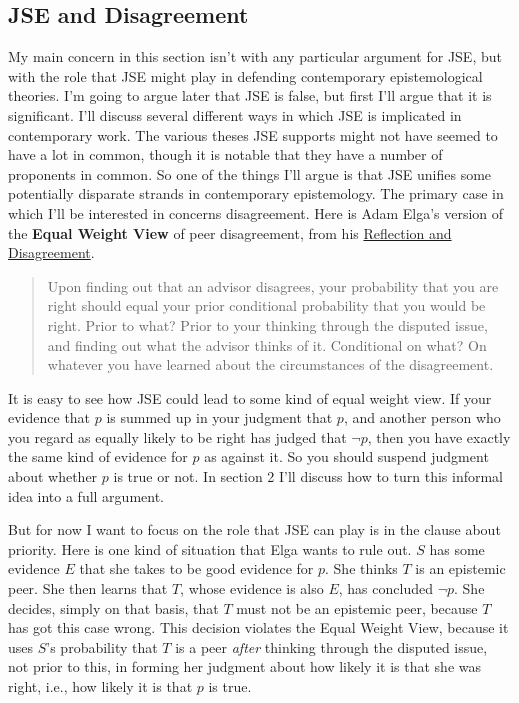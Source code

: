 \subsection{JSE and Disagreement}

My main concern in this section isn't with any particular argument for JSE, but with the role that JSE might play in defending contemporary epistemological theories. I'm going to argue later that JSE is false, but first I'll argue that it is significant. I'll discuss several different ways in which JSE is implicated in contemporary work. The various theses JSE supports might not have seemed to have a lot in common, though it is notable that they have a number of proponents in common. So one of the things I'll argue is that JSE unifies some potentially disparate strands in contemporary epistemology. The primary case in which I'll be interested in concerns disagreement. Here is Adam Elga's version of the \textbf{Equal Weight View} of peer disagreement, from his \href{http://philsci-archive.pitt.edu/archive/00002940/}{Reflection and Disagreement}.

\begin{quote}Upon finding out that an advisor disagrees, your probability that you are right should equal your prior conditional probability that you would be right. Prior to what? Prior to your thinking through the disputed issue, and finding out what the advisor thinks of it. Conditional on what? On whatever you have learned about the circumstances of the disagreement.\end{quote}

\noindent It is easy to see how JSE could lead to some kind of equal weight view. If your evidence that \(p\) is summed up in your judgment that \(p\), and another person who you regard as equally likely to be right has judged that \(\neg p\), then you have exactly the same kind of evidence for \(p\) as against it.  So you should suspend judgment about whether \(p\) is true or not. In section 2 I'll discuss how to turn this informal idea into a full argument.

But for now I want to focus on the  role that JSE can play is in the clause about priority. Here is one kind of situation that Elga wants to rule out. \(S\) has some evidence \(E\) that she takes to be good evidence for \(p\). She thinks \(T\) is an epistemic peer. She then learns that \(T\), whose evidence is also \(E\), has concluded \(\neg p\). She decides, simply on that basis, that \(T\) must not be an epistemic peer, because \(T\) has got this case wrong. This decision violates the Equal Weight View, because it uses \(S\)'s probability that \(T\) is a peer \textit{after} thinking through the disputed issue, not prior to this, in forming her judgment about how likely it is that she was right, i.e., how likely it is that \(p\) is true.

